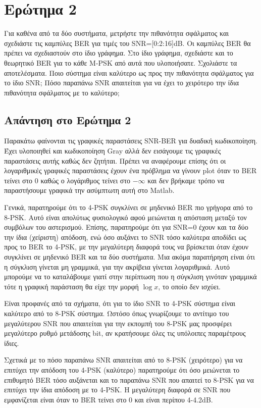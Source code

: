 \documentclass{article}
\begin{document}
\section{Ερώτημα 2} Για καθένα από τα δύο συστήματα, μετρήστε την πιθανότητα σφάλματος και σχεδιάστε τις καμπύλες BER για τιμές του SNR=[0:2:16]dB. Οι καμπύλες BER θα πρέπει να σχεδιαστούν στο ίδιο γράφημα. Στο ίδιο γράφημα, σχεδιάστε και το θεωρητικό BER για το κάθε M-PSK από αυτά που υλοποιήσατε. Σχολιάστε τα αποτελέσματα. Ποιο σύστημα είναι καλύτερο ως προς την πιθανότητα σφάλματος για το ίδιο SNR; Πόσο παραπάνω SNR απαιτείται για να έχει το χειρότερο την ίδια πιθανότητα σφάλματος με το καλύτερο;

\subsection*{Απάντηση στο Ερώτημα 2}

Παρακάτω φαίνονται τις γραφικές παραστάσεις SNR-BER για δυαδική κωδικοποίηση. Έχει υλοποιηθεί και κωδικοποίηση Gray αλλά δεν εισάγουμε τις γραφικές παραστάσεις αυτής καθώς δεν ζητήται. Πρέπει να αναφέρουμε επίσης ότι οι λογαριθμικές γραφικές παραστάσεις έχουν ένα πρόβλημα να γίνουν plot όταν το BER τείνει στο 0 καθώς ο λογάριθμος τείνει στο $-\infty$ και δεν βρήκαμε τρόπο να παραστήσουμε γραφικά την ασύμπτωτη αυτή στο Matlab. \par
Γενικά, παρατηρούμε ότι το 4-PSK συγκλίνει σε μηδενικό BER πιο γρήγορα από το 8-PSK. Αυτό είναι απολύτως φυσιολογικό αφού μειώνεται η απόσταση μεταξύ τον συμβόλων του αστερισμού. Επίσης, παρατηρούμε ότι για SNR=0 έχουν και τα δύο την ίδια (χείριστη) απόδοση, ενώ όσο αυξάνει το SNR τόσο καλύτερα αποδίδει ως προς το BER το 4-PSK, με την μεγαλύτερη διαφορά τους να βρίσκεται όταν έχουν συγκλίνει σε μηδενικό BER και τα δύο συστήματα. Μια ακόμα παρατήρηση είναι ότι η σύγκλιση γίνεται μη γραμμικά, για την ακρίβεια γίνεται λογαριθμικά. Αυτό μπορούμε να το καταλάβουμε γιατί στην περίπτωση που η σύγκλιση γινόταν γραμμικά τότε η γραφική παράσταση θα είχε την μορφή $\log x$, το οποίο δεν ισχύει.\par
Είναι προφανές από τα σχήματα, ότι για το ίδιο SNR το 4-PSK σύστημα είναι καλύτερο από το 8-PSK σύστημα. Ωστόσο όπως γνωρίζουμε το αντίτιμο του μεγαλύτερου SNR που απαιτείται για την εκπομπή του 8-PSK μας προσφέρει μεγαλύτερο ρυθμό μετάδοσης bit, αν κρατήσουμε όλες τις υπόλοιπες παραμέτρους ίδιες. \par
Σχετικά με το πόσο παραπάνω SNR απαιτείται από το 8-PSK (χειρότερο) για να επιτύχει την απόδοση του 4-PSK (καλύτερο) παρατηρούμε ότι όσο μειώνεται το επιθυμητό BER τόσο αυξάνεται και το παραπάνω SNR που απαιτεί το 8-PSK για να επιτύχει την ίδια απόδοση με το 4-PSK. Η μεγαλύτερη διαφορά σε SNR που εμφανίζεται είναι όταν το BER τείνει στο 0 και είναι περίπου 4-4.2dB. 
\end{document}
